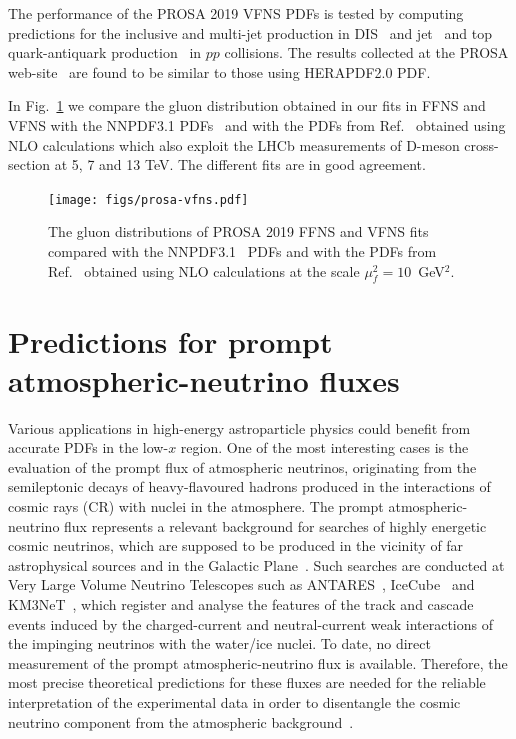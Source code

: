 The performance of the PROSA 2019 VFNS PDFs is tested by computing predictions for the inclusive and multi-jet production in DIS~\cite{Chekanov:2002be,Chekanov:2006xr,Abramowicz:2010cka,Aktas:2007aa,Aaron:2010ac} 
and jet~\cite{Chatrchyan:2012bja} and top quark-antiquark production~\cite{Sirunyan:2017azo,Sirunyan:2019zvx} in $pp$ collisions. The results collected at the PROSA web-site~\cite{prosaweb} are found to be similar to those using HERAPDF2.0 PDF.

{\color{blue} In Fig.~\ref{fig:vfns} we compare the gluon distribution obtained in our fits in FFNS and VFNS with the NNPDF3.1 PDFs~\cite{Ball:2017nwa} and with the PDFs from Ref.~\cite{Bertone:2018dse} obtained using NLO calculations which also exploit the LHCb measurements of D-meson cross-section at 5, 7 and 13 TeV. The different fits are in good agreement.}

\begin{figure}
	\centering
	\texttt{[image: figs/prosa-vfns.pdf]}
	\caption{The gluon distributions of PROSA 2019 FFNS and VFNS fits compared with the NNPDF3.1~\cite{Ball:2017nwa} PDFs and with the PDFs from Ref.~\cite{Bertone:2018dse} obtained using NLO calculations at the scale $\mu^2_f=10$~GeV$^2$.}
	\label{fig:vfns}
\end{figure}

\section{Predictions for prompt atmospheric-neutrino fluxes}
\label{sec:astro}
Various applications in high-energy astroparticle physics could benefit from accurate PDFs in the low-$x$ region. One of the most interesting cases is the evaluation of the prompt flux of atmospheric neutrinos,
originating from the semileptonic decays of heavy-flavoured hadrons produced in the interactions of cosmic rays (CR) with nuclei in the atmosphere. The prompt atmospheric-neutrino flux represents a relevant background for searches of highly energetic cosmic neutrinos, which are supposed to be produced in the vicinity of far astrophysical sources and in the Galactic Plane~\cite{Gaisser:2016uoy}.  
Such searches are conducted at Very Large Volume Neutrino Telescopes such as ANTARES~\cite{Collaboration:2011nsa}, IceCube~\cite{Gaisser:2014foa} and KM3NeT~\cite{Adrian-Martinez:2016fdl}, which register and analyse the features of the track and cascade events induced by the charged-current and neutral-current weak interactions of the impinging neutrinos with the water/ice nuclei. To date, no direct measurement of the prompt atmospheric-neutrino flux is available. Therefore, the most precise theoretical predictions for these fluxes are needed for the reliable interpretation of the experimental data in order to disentangle the cosmic neutrino component from the atmospheric background~\cite{Mascaretti:2019uqn}.

